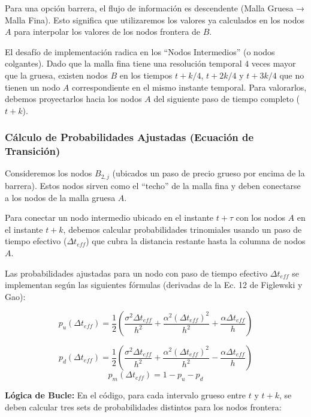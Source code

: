 Para una opción barrera, el flujo de información es descendente (Malla Gruesa → Malla Fina). Esto significa que utilizaremos los valores ya calculados en los nodos $A$ para interpolar los valores de los nodos frontera de $B$.

El desafío de implementación radica en los ``Nodos Intermedios'' (o nodos colgantes). Dado que la malla fina tiene una resolución temporal $4$ veces mayor que la gruesa, existen nodos $B$ en los tiempos $t+k/4$, $t+2k/4$ y $t+3k/4$ que no tienen un nodo $A$ correspondiente en el mismo instante temporal. Para valorarlos, debemos proyectarlos hacia los nodos $A$ del siguiente paso de tiempo completo ($t+k$).

\subsubsection{Cálculo de Probabilidades Ajustadas (Ecuación de Transición)} 

Consideremos los nodos $B_{2,j}$ (ubicados un paso de precio grueso por encima de la barrera). Estos nodos sirven como el ``techo'' de la malla fina y deben conectarse a los nodos de la malla gruesa $A$.

Para conectar un nodo intermedio ubicado en el instante $t+\tau$ con los nodos $A$ en el instante $t+k$, debemos calcular probabilidades trinomiales usando un paso de tiempo efectivo ($\Delta t_{eff}$) que cubra la distancia restante hasta la columna de nodos $A$.

Las probabilidades ajustadas para un nodo con paso de tiempo efectivo $\Delta t_{eff}$ se implementan según las siguientes fórmulas (derivadas de la Ec. 12 de Figlewski y Gao):

\begin{equation} 
  p_u(\Delta t_{eff}) = \frac{1}{2} \left( \frac{\sigma^2 \Delta t_{eff}}{h^2} + \frac{\alpha^2 (\Delta t_{eff})^2}{h^2} + \frac{\alpha \Delta t_{eff}}{h} \right) 
\end{equation}

\begin{equation} 
  p_d(\Delta t_{eff}) = \frac{1}{2} \left( \frac{\sigma^2 \Delta t_{eff}}{h^2} + \frac{\alpha^2 (\Delta t_{eff})^2}{h^2} - \frac{\alpha \Delta t_{eff}}{h} \right) 
\end{equation}
\begin{equation} 
  p_m(\Delta t_{eff}) = 1 - p_u - p_d 
\end{equation}

\textbf{Lógica de Bucle:} En el código, para cada intervalo grueso entre $t$ y $t+k$, se deben calcular tres sets de probabilidades distintos para los nodos frontera: 

